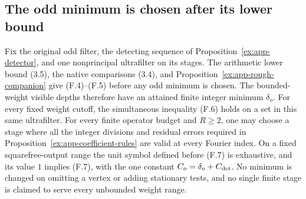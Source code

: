 \subsection{The odd minimum is chosen after its lower bound}
\begin{proposition}\label{ex:app-odd-minimum}
Fix the original odd filter, the detecting sequence of
Proposition~\ref{ex:app-detector}, and one nonprincipal ultrafilter
on its stages. The arithmetic lower bound (3.5), the native comparisons
(3.4), and Proposition~\ref{ex:app-rough-companion} give (F.4)--(F.5)
before any odd minimum is chosen. The bounded-weight visible depths
therefore have an attained finite integer minimum $\delta_o$.
For every fixed weight cutoff, the simultaneous inequality (F.6)
holds on a set in this same ultrafilter. For every finite operator
budget and $R\ge2$, one may choose a stage where all the integer
divisions and residual errors required in
Proposition~\ref{ex:app-coefficient-rules} are valid at every Fourier
index.
On a fixed squarefree-output range the unit symbol defined before
(F.7) is exhaustive, and its value $1$ implies (F.7), with the one
constant $C_o=\delta_o+C_{\rm det}$. No minimum is changed on
omitting a vertex or adding stationary tests, and no single finite
stage is claimed to serve every unbounded weight range.
\end{proposition}
